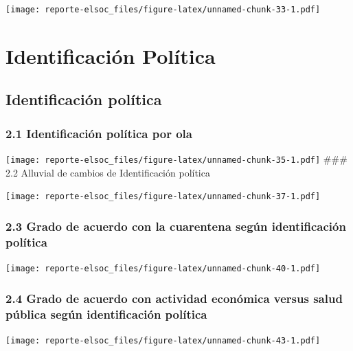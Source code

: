 \documentclass[
  12pt,
  openany]{book}
\begin{document}
\texttt{[image: reporte-elsoc\_files/figure-latex/unnamed-chunk-33-1.pdf]}

\hypertarget{identificaciuxf3n-poluxedtica}{%
\chapter{Identificación Política}\label{identificaciuxf3n-poluxedtica}}

\hypertarget{identificaciuxf3n-poluxedtica-1}{%
\section{Identificación política}\label{identificaciuxf3n-poluxedtica-1}}

\hypertarget{identificaciuxf3n-poluxedtica-por-ola}{%
\subsection{2.1 Identificación política por ola}\label{identificaciuxf3n-poluxedtica-por-ola}}

\texttt{[image: reporte-elsoc\_files/figure-latex/unnamed-chunk-35-1.pdf]}
\#\#\# 2.2 Alluvial de cambios de Identificación política

\texttt{[image: reporte-elsoc\_files/figure-latex/unnamed-chunk-37-1.pdf]}

\hypertarget{grado-de-acuerdo-con-la-cuarentena-seguxfan-identificaciuxf3n-poluxedtica}{%
\subsection{2.3 Grado de acuerdo con la cuarentena según identificación política}\label{grado-de-acuerdo-con-la-cuarentena-seguxfan-identificaciuxf3n-poluxedtica}}

\texttt{[image: reporte-elsoc\_files/figure-latex/unnamed-chunk-40-1.pdf]}

\hypertarget{grado-de-acuerdo-con-actividad-econuxf3mica-versus-salud-puxfablica-seguxfan-identificaciuxf3n-poluxedtica}{%
\subsection{2.4 Grado de acuerdo con actividad económica versus salud pública según identificación política}\label{grado-de-acuerdo-con-actividad-econuxf3mica-versus-salud-puxfablica-seguxfan-identificaciuxf3n-poluxedtica}}

\texttt{[image: reporte-elsoc\_files/figure-latex/unnamed-chunk-43-1.pdf]}
\end{document}
